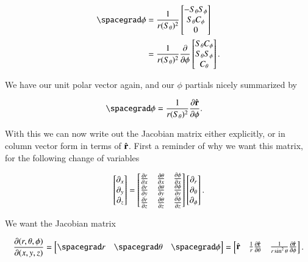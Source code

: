 \begin{align*}
\spacegrad \phi 
&=
\inv{r (S_\theta)^2}
\begin{bmatrix}
-S_\theta S_\phi \\
S_\theta C_\phi \\
0
\end{bmatrix} \\
&=
\inv{r (S_\theta)^2}
\PD{\phi}{}
\begin{bmatrix}
S_\theta C_\phi \\
S_\theta S_\phi \\
C_\theta
\end{bmatrix}.
\end{align*}

We have our unit polar vector again, and our $\phi$ partials nicely summarized by

\begin{align}\label{eqn:jacobianSphericalPolar:15}
\spacegrad \phi 
&=
\inv{r (S_\theta)^2}
\PD{\phi}{\rcap}.
\end{align}

With this we can now write out the Jacobian matrix either explicitly, or in column vector form in terms of $\rcap$.  First a reminder of why we want this matrix, for the following change of variables

\begin{align}\label{eqn:jacobianSphericalPolar:16}
\begin{bmatrix}
\partial_x \\
\partial_y \\
\partial_z
\end{bmatrix}
= 
\begin{bmatrix}
\PD{x}{r} &\PD{x}{\theta} &\PD{x}{\phi}  \\
\PD{y}{r} &\PD{y}{\theta} &\PD{y}{\phi}  \\
\PD{z}{r} &\PD{z}{\theta} &\PD{z}{\phi} 
\end{bmatrix}
\begin{bmatrix}
\partial_r \\
\partial_\theta \\
\partial_\phi
\end{bmatrix}
.
\end{align}

We want the Jacobian matrix

\begin{align}\label{eqn:jacobianSphericalPolar:17}
\frac{\partial (r,\theta,\phi)}{\partial (x, y, z)}
=
\begin{bmatrix}
\spacegrad r & \spacegrad \theta & \spacegrad \phi
\end{bmatrix}
=
\begin{bmatrix}
\rcap & \inv{r} \PD{\theta}{\rcap} & \inv{r \sin^2\theta} \PD{\phi}{\rcap}
\end{bmatrix}.
\end{align}

